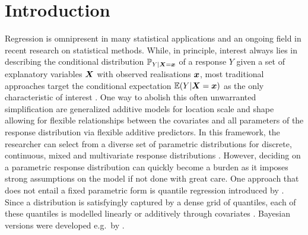 \documentclass[12pt]{article}
\theoremstyle{plain}
\begin{document}
\section{Introduction}\label{sec:intro}
Regression is omnipresent in many statistical applications and an ongoing field in recent research on statistical methods. While, in principle, interest always lies in describing the conditional distribution $\mathbb{P}_{Y|\text{\boldmath$X$}=\text{\boldmath$x$}}$ of a response $Y$ given a set of explanatory variables $\text{\boldmath$X$}$ with observed realisations $\text{\boldmath$x$}$, most traditional approaches target the conditional expectation $\mathbb{E}(Y|\text{\boldmath$X$} = \text{\boldmath$x$})$ as the only characteristic of interest \citep[e.g.~generalized linear or additive models;][]{nelder1972generalized,hastie1990generalized}.
One way to abolish this often unwarranted simplification are generalized additive models for location scale and shape \citep[GAMLSS;][]{rigby2005}  allowing for flexible relationships between the covariates and all parameters of the response distribution via flexible additive predictors. In this framework, the researcher can select from a diverse set of parametric distributions for discrete, continuous, mixed and multivariate response distributions \citep{klein2015bayesian,KleKneKlaLan2015}. However, deciding on a parametric response distribution can quickly become a burden as it imposes strong assumptions on the model if not done with great care. One approach that does not entail a fixed parametric form is quantile regression introduced by \cite{KoeBas1978}. Since a distribution is satisfyingly captured by a dense grid of quantiles, each of these quantiles is modelled linearly or additively through covariates \citep{horowitz2005nonparametric}. Bayesian versions were developed e.g.~by \cite{yu2001bayesian,waldmann2013bayesian}.
\end{document}
